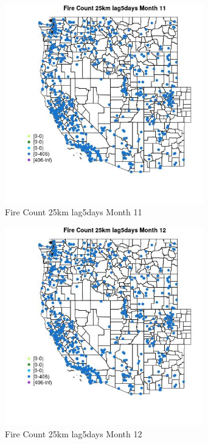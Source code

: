 \begin{figure} 
\centering  
\includegraphics[width=0.77\textwidth]{Code_Outputs/Report_ML_input_PM25_Step4_part_f_de_duplicated_aves_prioritize_24hr_obswNAs_MapObsMo11Fire_Count_25km_lag5days.jpg} 
\caption{\label{fig:Report_ML_input_PM25_Step4_part_f_de_duplicated_aves_prioritize_24hr_obswNAsMapObsMo11Fire_Count_25km_lag5days}Fire Count 25km lag5days Month 11} 
\end{figure} 
 

\begin{figure} 
\centering  
\includegraphics[width=0.77\textwidth]{Code_Outputs/Report_ML_input_PM25_Step4_part_f_de_duplicated_aves_prioritize_24hr_obswNAs_MapObsMo12Fire_Count_25km_lag5days.jpg} 
\caption{\label{fig:Report_ML_input_PM25_Step4_part_f_de_duplicated_aves_prioritize_24hr_obswNAsMapObsMo12Fire_Count_25km_lag5days}Fire Count 25km lag5days Month 12} 
\end{figure} 
 

